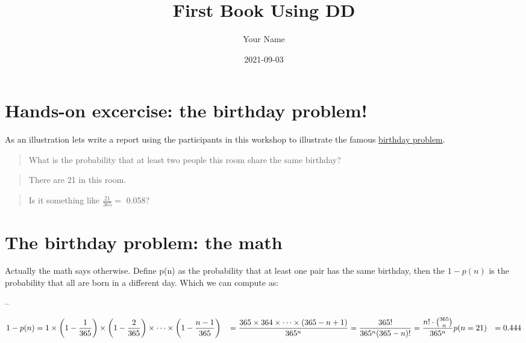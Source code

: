 \documentclass[
]{book}
\title{First Book Using DD}
\author{Your Name}
\date{2021-09-03}
\begin{document}
\maketitle

{
\setcounter{tocdepth}{1}
\tableofcontents
}
\hypertarget{hands-on-excercise-the-birthday-problem}{%
\chapter{Hands-on excercise: the birthday problem!}\label{hands-on-excercise-the-birthday-problem}}

As an illustration lets write a report using the participants in this workshop to illustrate the famous \href{https://en.wikipedia.org/wiki/Birthday_problem}{birthday problem}.

\begin{quote}
What is the probability that at least two people this room share the same birthday?
\end{quote}

\begin{quote}
There are 21 in this room.
\end{quote}

\begin{quote}
Is it something like \(\frac{21}{365} =\) 0.058?
\end{quote}

\hypertarget{the-birthday-problem-the-math}{%
\chapter{The birthday problem: the math}\label{the-birthday-problem-the-math}}

Actually the math says otherwise. Define p(n) as the probability that at least one pair has the same birthday, then the \(1 - p(n)\) is the probability that all are born in a different day. Which we can compute as:

--

\begin{align} 
 1 -  p(n) &= 1 \times \left(1-\frac{1}{365}\right) \times \left(1-\frac{2}{365}\right) \times \cdots \times \left(1-\frac{n-1}{365}\right) \nonumber  \newline
 &= \frac{ 365 \times 364 \times \cdots \times (365-n+1) }{ 365^n } \nonumber \newline
 &= \frac{ 365! }{ 365^n (365-n)!} = \frac{n!\cdot\binom{365}{n}}{365^n}\newline
p(n= 21) &= 0.444  \nonumber
\end{align}
\end{document}
